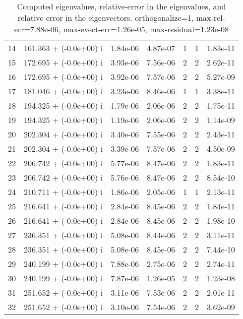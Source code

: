 \begin{table}[H]
\begin{center}
\begin{tabular}{|c|c|c|c|c|c|c|}
    14  &    161.363 + (-0.0e+00) i  &    1.84e-06      &   4.87e-07    &   1    &  1   &    1.83e-11 \\
    15  &    172.695 + (-0.0e+00) i  &    3.93e-06      &   7.56e-06    &   2    &  2   &    2.62e-11 \\
    16  &    172.695 + (-0.0e+00) i  &    3.92e-06      &   7.57e-06    &   2    &  2   &    5.27e-09 \\
    17  &    181.046 + (-0.0e+00) i  &    3.23e-06      &   8.46e-06    &   1    &  1   &    3.38e-11 \\
    18  &    194.325 + (-0.0e+00) i  &    1.79e-06      &   2.06e-06    &   2    &  2   &    1.75e-11 \\
    19  &    194.325 + (-0.0e+00) i  &    1.19e-06      &   2.06e-06    &   2    &  2   &    1.14e-09 \\
    20  &    202.304 + (-0.0e+00) i  &    3.40e-06      &   7.55e-06    &   2    &  2   &    2.43e-11 \\
    21  &    202.304 + (-0.0e+00) i  &    3.39e-06      &   7.57e-06    &   2    &  2   &    4.50e-09 \\
    22  &    206.742 + (-0.0e+00) i  &    5.77e-06      &   8.47e-06    &   2    &  2   &    1.83e-11 \\
    23  &    206.742 + (-0.0e+00) i  &    5.76e-06      &   8.47e-06    &   2    &  2   &    8.54e-10 \\
    24  &    210.711 + (-0.0e+00) i  &    1.86e-06      &   2.05e-06    &   1    &  1   &    2.13e-11 \\
    25  &    216.641 + (-0.0e+00) i  &    2.84e-06      &   8.45e-06    &   2    &  2   &    1.84e-11 \\
    26  &    216.641 + (-0.0e+00) i  &    2.84e-06      &   8.45e-06    &   2    &  2   &    1.98e-10 \\
    27  &    236.351 + (-0.0e+00) i  &    5.08e-06      &   8.44e-06    &   2    &  2   &    3.11e-11 \\
    28  &    236.351 + (-0.0e+00) i  &    5.08e-06      &   8.45e-06    &   2    &  2   &    7.44e-10 \\
    29  &    240.199 + (-0.0e+00) i  &    7.88e-06      &   2.75e-06    &   2    &  2   &    2.74e-11 \\
    30  &    240.199 + (-0.0e+00) i  &    7.87e-06      &   1.26e-05    &   2    &  2   &    1.23e-08 \\
    31  &    251.652 + (-0.0e+00) i  &    3.11e-06      &   7.53e-06    &   2    &  2   &    2.01e-11 \\
    32  &    251.652 + (-0.0e+00) i  &    3.10e-06      &   7.54e-06    &   2    &  2   &    3.62e-09 \\
\hline
\end{tabular}
\caption{Computed eigenvalues, relative-error in the eigenvalues, and relative error in the eigenvectors. orthogonalize=1, max-rel-err=7.88e-06, max-evect-err=1.26e-05, max-residual=1.23e-08
}\label{table:genEigspipeze8.order4.ng3.hdf}
\end{center}
\end{table}
